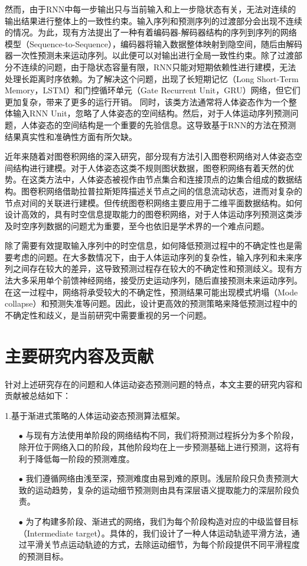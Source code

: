 然而，由于RNN中每一步输出只与当前输入和上一步隐状态有关，无法对连续的输出结果进行整体上的一致性约束。输入序列和预测序列的过渡部分会出现不连续的情况。为此，现有方法提出了一种有着编码器-解码器结构的序列到序列的网络模型（Sequence-to-Sequence），编码器将输入数据整体映射到隐空间，随后由解码器一次性预测未来运动序列。以此便可以对输出进行全局一致性约束。除了过渡部分不连续的问题，由于隐状态容量有限，RNN只能对短期依赖性进行建模，无法处理长距离时序依赖。为了解决这个问题，出现了长短期记忆\parencite{shi2015convolutional}（Long Short-Term Memory，LSTM）和门控循环单元\parencite{cho2014learning}（Gate Recurrent Unit，GRU）网络，但它们更加复杂，带来了更多的运行开销。
同时，该类方法通常将人体姿态作为一个整体输入RNN Unit，忽略了人体姿态的空间结构。然后，对于人体运动序列预测问题，人体姿态的空间结构是一个重要的先验信息。这导致基于RNN的方法在预测结果真实性和准确性方面有所欠缺。

近年来随着对图卷积网络\parencite{kipf2016semi}的深入研究，部分现有方法引入图卷积网络对人体姿态空间结构进行建模。对于人体姿态这类不规则图状数据，图卷积网络有着天然的优势。在这类方法中，人体姿态被视作由节点集合和连接顶点的边集合组成的数据结构。图卷积网络借助拉普拉斯矩阵描述关节点之间的信息流动状态，进而对复杂的节点对间的关联进行建模。但传统图卷积网络主要应用于二维平面数据结构。如何设计高效的，具有时空信息提取能力的图卷积网络，对于人体运动序列预测这类涉及时空序列数据的问题尤为重要，至今也依旧是学术界的一个难点问题。

除了需要有效提取输入序列中的时空信息，如何降低预测过程中的不确定性也是需要考虑的问题。在大多数情况下，由于人体运动序列的复杂性，输入序列和未来序列之间存在较大的差异，这导致预测过程存在较大的不确定性和预测歧义。现有方法大多采用单个前馈神经网络，接受历史运动序列，随后直接预测未来运动序列。在这一过程中，网络将承受较大的不确定性，预测结果可能出现模式坍塌（Mode collapse）和预测失准等问题。因此，设计更高效的预测策略来降低预测过程中的不确定性和歧义，是当前研究中需要重视的另一个问题。

\section{主要研究内容及贡献}
针对上述研究存在的问题和人体运动姿态预测问题的特点，本文主要的研究内容和贡献被总结如下：

1.基于渐进式策略的人体运动姿态预测算法框架。
\begin{enumerate}[topsep = 0 pt, itemsep= 0 pt, parsep=0pt, partopsep=0pt, leftmargin=44pt, itemindent=0pt, labelsep=6pt]
	\item[$\bullet$] 与现有方法使用单阶段的网络结构不同，我们将预测过程拆分为多个阶段，除开位于网络入口的阶段，其他阶段均在上一步预测基础上进行预测，这将有利于降低每一阶段的预测难度。
	\item[$\bullet$] 我们遵循网络由浅至深，预测难度由易到难的原则。浅层阶段只负责预测大致的运动趋势，复杂的运动细节预测则由具有深层语义提取能力的深层阶段负责。
	\item[$\bullet$] 为了构建多阶段、渐进式的网络，我们为每个阶段构造对应的中级监督目标（Intermediate target）。具体的，我们设计了一种人体运动轨迹平滑方法，通过平滑关节点运动轨迹的方式，去除运动细节，为每个阶段提供不同平滑程度的预测目标。
\end{enumerate}

